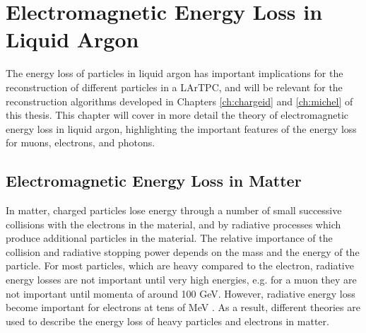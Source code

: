 \chapter{\label{ch:energyloss}Electromagnetic Energy Loss in Liquid Argon} 

% 

\minitoc

The energy loss of particles in liquid argon has important implications for the
reconstruction of different particles in a LArTPC, and will be relevant for the
reconstruction algorithms developed in Chapters \ref{ch:chargeid} and 
\ref{ch:michel} of  this thesis. This chapter will cover in more detail the 
theory of electromagnetic energy loss in liquid argon, highlighting the 
important features of the energy loss for muons, electrons, and photons.

\section{Electromagnetic Energy Loss in Matter}
In matter, charged particles lose energy through a number of small successive
collisions with the electrons in the material, and by radiative processes which
produce additional particles in the material. The relative importance of the
collision and radiative stopping power depends on the mass and the energy of the
particle. For most particles, which are heavy compared to the electron, 
radiative energy losses are not important until very high energies, e.g. for a 
muon they are not important until momenta of around 100 GeV. However, 
radiative energy loss become important for electrons at tens of MeV 
\cite{PhysRevD.98.030001}. As a result, different theories are used to 
describe the energy loss of heavy particles and electrons in matter.

